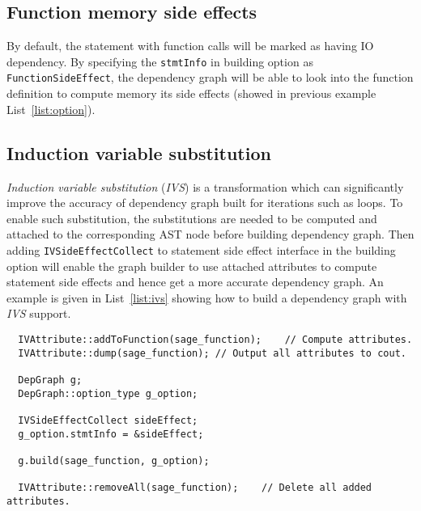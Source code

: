 \documentclass[preprint]{llncs}
\begin{document}
\subsection{Function memory side effects}
\label{sec:option:funcion}
By default, the statement with function calls will be marked as having IO dependency.
By specifying the \texttt{stmtInfo} in building option as \texttt{FunctionSideEffect},
  the dependency graph will be able to look into the function definition
  to compute memory its side effects
  (showed in previous example List~\ref{list:option}).

\subsection{Induction variable substitution}
\label{sec:option:ivs}
\emph{Induction variable substitution} (\emph{IVS}) is a transformation which can significantly improve
 the accuracy of dependency graph built for iterations such as loops.
To enable such substitution,
  the substitutions are needed to be computed and attached to the corresponding AST node
  before building dependency graph.
Then adding \texttt{IVSideEffectCollect} to statement side effect interface in the building option
  will enable the graph builder to use attached attributes to compute statement side effects
  and hence get a more accurate dependency graph.
An example is given in List~\ref{list:ivs} showing how to build a dependency graph
  with \emph{IVS} support.

\begin{lstlisting}
  IVAttribute::addToFunction(sage_function);    // Compute attributes.
  IVAttribute::dump(sage_function); // Output all attributes to cout.

  DepGraph g;
  DepGraph::option_type g_option;

  IVSideEffectCollect sideEffect;
  g_option.stmtInfo = &sideEffect;

  g.build(sage_function, g_option);

  IVAttribute::removeAll(sage_function);    // Delete all added attributes.
\end{lstlisting}
\end{document}
